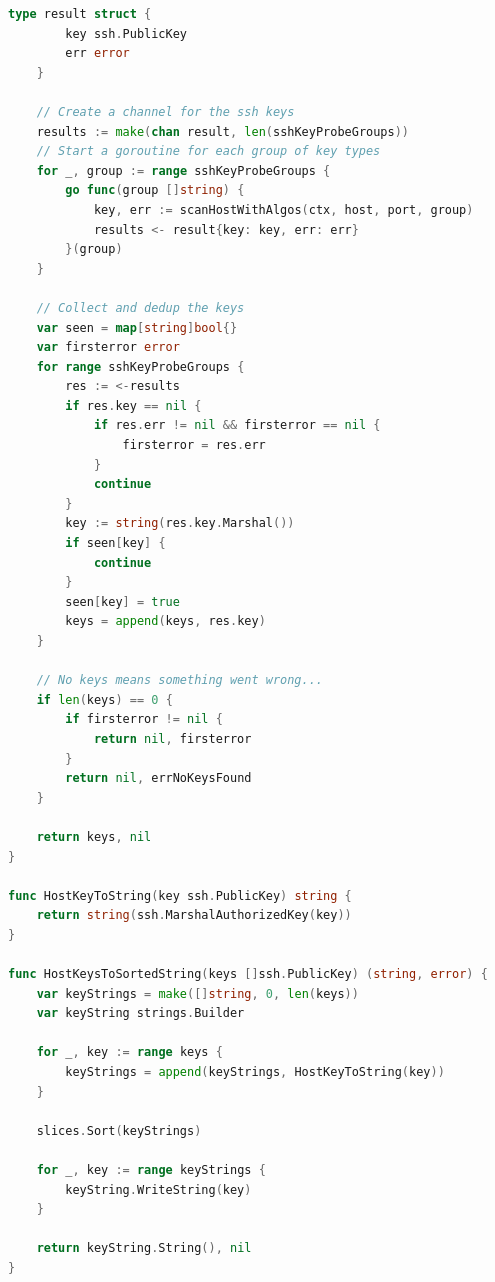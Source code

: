 \begin{lstlisting}[language=go]
	type result struct {
		key ssh.PublicKey
		err error
	}

	// Create a channel for the ssh keys
	results := make(chan result, len(sshKeyProbeGroups))
	// Start a goroutine for each group of key types
	for _, group := range sshKeyProbeGroups {
		go func(group []string) {
			key, err := scanHostWithAlgos(ctx, host, port, group)
			results <- result{key: key, err: err}
		}(group)
	}

	// Collect and dedup the keys
	var seen = map[string]bool{}
	var firsterror error
	for range sshKeyProbeGroups {
		res := <-results
		if res.key == nil {
			if res.err != nil && firsterror == nil {
				firsterror = res.err
			}
			continue
		}
		key := string(res.key.Marshal())
		if seen[key] {
			continue
		}
		seen[key] = true
		keys = append(keys, res.key)
	}

	// No keys means something went wrong...
	if len(keys) == 0 {
		if firsterror != nil {
			return nil, firsterror
		}
		return nil, errNoKeysFound
	}

	return keys, nil
}

func HostKeyToString(key ssh.PublicKey) string {
	return string(ssh.MarshalAuthorizedKey(key))
}

func HostKeysToSortedString(keys []ssh.PublicKey) (string, error) {
	var keyStrings = make([]string, 0, len(keys))
	var keyString strings.Builder

	for _, key := range keys {
		keyStrings = append(keyStrings, HostKeyToString(key))
	}

	slices.Sort(keyStrings)

	for _, key := range keyStrings {
		keyString.WriteString(key)
	}

	return keyString.String(), nil
}
\end{lstlisting}

